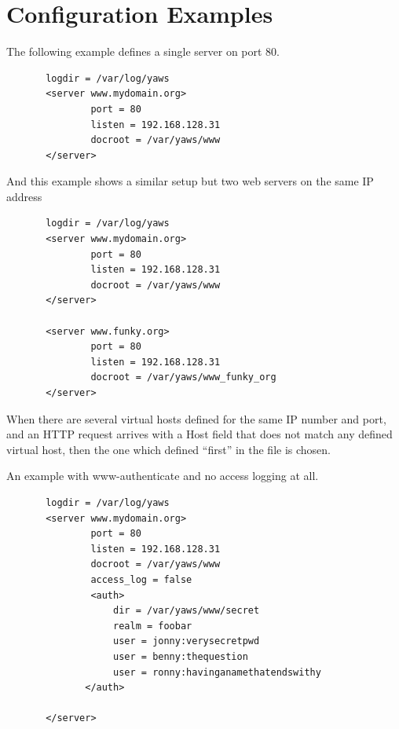 \documentclass[11pt,oneside,english]{book}
\begin{document}
\section{Configuration Examples}



       The  following  example  defines a single server on
       port 80.

\begin{verbatim}
       logdir = /var/log/yaws
       <server www.mydomain.org>
               port = 80
               listen = 192.168.128.31
               docroot = /var/yaws/www
       </server>

\end{verbatim}
       And this example shows a similar setup but two web­
       servers on the same IP address

\begin{verbatim}
       logdir = /var/log/yaws
       <server www.mydomain.org>
               port = 80
               listen = 192.168.128.31
               docroot = /var/yaws/www
       </server>

       <server www.funky.org>
               port = 80
               listen = 192.168.128.31
               docroot = /var/yaws/www_funky_org
       </server>

\end{verbatim}



When there are several
virtual hosts defined for the same IP number and port,
and an HTTP request arrives with a Host field that does
not match any defined virtual host, then the one which
defined ``first'' in the file is chosen.


An example with www-authenticate and no access logging at all.

\begin{verbatim}
       logdir = /var/log/yaws
       <server www.mydomain.org>
               port = 80
               listen = 192.168.128.31
               docroot = /var/yaws/www
               access_log = false
               <auth>
                   dir = /var/yaws/www/secret
                   realm = foobar
                   user = jonny:verysecretpwd
                   user = benny:thequestion
                   user = ronny:havinganamethatendswithy
              </auth>

       </server>
\end{verbatim}
\end{document}
